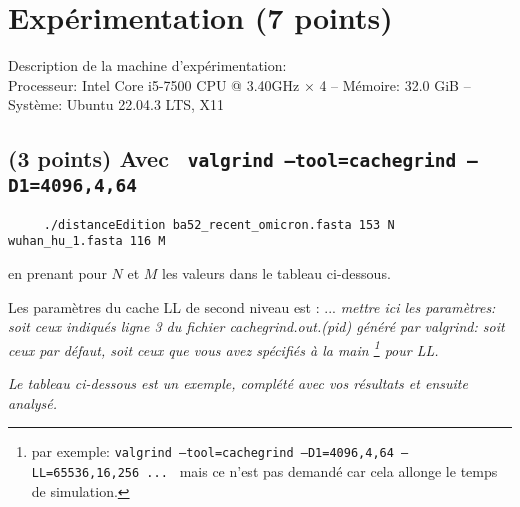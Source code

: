 \documentclass[10pt,a4paper]{article}
\begin{document}
\section{Expérimentation (7 points)}

Description de la machine d'expérimentation:  \\
Processeur: Intel Core i5-7500 CPU @ 3.40GHz × 4  --
Mémoire: 32.0 GiB --
Système: Ubuntu 22.04.3 LTS, X11

\subsection{(3 points) Avec {\tt 
	valgrind --tool=cachegrind --D1=4096,4,64
}} 
\begin{verbatim}
     ./distanceEdition ba52_recent_omicron.fasta 153 N wuhan_hu_1.fasta 116 M 
\end{verbatim}
en prenant pour $N$ et $M$ les valeurs dans le tableau ci-dessous.


Les paramètres du cache LL de second niveau est : ...
{\em mettre ici les paramètres: soit ceux indiqués ligne 3
du fichier cachegrind.out.(pid) généré par valgrind: soit ceux par défaut,
soit ceux que vous avez spécifiés à la main
\footnote{par exemple:
{\tt valgrind --tool=cachegrind --D1=4096,4,64 --LL=65536,16,256  ... }
mais ce n'est pas demandé car cela allonge le temps de simulation. } 
 pour LL. }

{\em Le tableau ci-dessous est un exemple,  complété avec vos résultats et 
ensuite analysé.}
\end{document}
